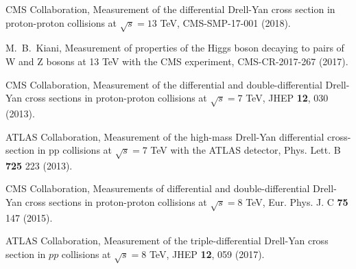 \documentclass[a4paper,10pt,english]{article}
\begin{document}
\vspace{-0.2cm}

\vspace{0.2cm}
\begin{thebibliography}{References}

CMS Collaboration, Measurement of the differential Drell-Yan cross section in proton-proton collisions at $\sqrt{s}=13$ TeV, CMS-SMP-17-001 (2018).

M.\ B.\ Kiani, Measurement of properties of the Higgs boson decaying to pairs of W and Z bosons at 13 TeV with the
CMS experiment, CMS-CR-2017-267 (2017).

CMS Collaboration, Measurement of the differential and double-differential Drell-Yan cross sections in proton-proton collisions
at $\sqrt{s}=7$ TeV, JHEP \textbf{12}, 030 (2013).

ATLAS Collaboration, Measurement of the high-mass Drell-Yan differential cross-section in pp collisions at
$\sqrt{s}=7$ TeV with the ATLAS detector, Phys. Lett. B \textbf{725} 223 (2013).

CMS Collaboration, Measurements of differential and double-differential Drell-Yan cross sections in proton-proton
collisions at $\sqrt{s}=8$ TeV, Eur. Phys. J. C \textbf{75} 147 (2015).

ATLAS Collaboration, Measurement of the triple-differential Drell-Yan cross section in $pp$ collisions at $\sqrt{s}=8$ TeV,
JHEP \textbf{12}, 059 (2017).
\end{thebibliography}
\end{document}

